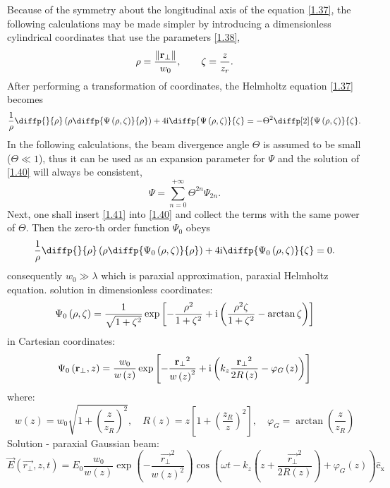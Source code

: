 Because of the symmetry about the longitudinal axis of the equation \ref{1.37}, the following calculations may be made simpler by introducing a dimensionless cylindrical coordinates that use the parameters \ref{1.38},
\begin{equation}
\label{1.39}
\rho = \frac{\lVert\mathbf{r_\bot}\rVert}{w_0}, \qquad \zeta = \frac{z}{z_r}.
\end{equation}
After performing a transformation of coordinates, the Helmholtz equation \ref{1.37} becomes 
\begin{equation}
\label{1.40}
\frac{1}{\rho} \diffp{}{\rho}\left(\rho \diffp{\Psi \left(\rho, \zeta \right)}{\rho} \right) + 4 \i \diffp{\Psi \left(\rho, \zeta \right)}{\zeta}  = - \Theta^2 \diffp[2]{\Psi \left(\rho, \zeta \right)}{\zeta}.
\end{equation}
In the following calculations, the beam divergence angle $ \Theta $ is assumed to be small ($ \Theta \ll 1 $), thus it can be used as an expansion parameter for $ \Psi $ and the solution of \ref{1.40} will always be consistent,
\begin{equation}
\label{1.41}
\Psi = \sum_{n = 0}^{+\infty} \Theta^{2n} \Psi_{2n}.
\end{equation}
Next, one shall insert \ref{1.41} into \ref{1.40} and collect the terms with the same power of $ \Theta $. Then the zero-th order function $ \Psi_0 $ obeys
\begin{equation}
\label{1.42}
\frac{1}{\rho} \diffp{}{\rho}\left(\rho \diffp{\Psi_0 \left(\rho, \zeta \right)}{\rho} \right) + 4 \i \diffp{\Psi_0\left(\rho, \zeta \right)}{\zeta} = 0.
\end{equation}
consequently $  w_0 \gg \lambda $
which is paraxial approximation, paraxial Helmholtz equation. 
solution in dimensionless coordinates:
\begin{equation}
\Psi_0 \left(\rho, \zeta \right) = \frac{1}{\sqrt{1 + \zeta^2}} \exp{\left[- \frac{\rho^2}{1 + \zeta^2} + \mathrm{i}\left(\frac{\rho^2 \zeta}{1 + \zeta^2} - \arctan{\zeta} \right) \right]} 
\end{equation}
in Cartesian coordinates:
\begin{equation}
\Psi_0 \left(\mathbf{r_\bot}, z \right) = \frac{w_0}{w\left(z\right)} \exp{\left[- \frac{\mathbf{r_\bot}^2}{w\left(z \right)^2} + \mathrm{i}\left( k_z \frac{\mathbf{r_\bot}^2}{2 R\left(z \right)} - \varphi_G \left( z\right) \right) \right]}
\end{equation}
where:
\begin{equation}
w\left(z\right) = w_0 \sqrt{1 + \left(\frac{z}{z_R}\right)^2}, \quad R\left(z \right) = z \left[1 + \left(\frac{z_R}{z} \right)^2\right], \quad \varphi_G = \arctan{\left(\frac{z}{z_R}\right)}
\end{equation}
Solution - paraxial Gaussian beam:
\begin{equation}
\vec{E}\left(\vec{r_\bot}, z, t \right) = E_0 \frac{w_0}{w(z)} \exp\left(-\frac{\vec{r_\bot}^2}{w(z)^2}\right) \cos\left(\omega t - k_z \left(z + \frac{\vec{r_\bot}^2}{2 R(z)} \right) + \varphi_G(z) \right) \mathrm{\hat{e}_x}
\end{equation}